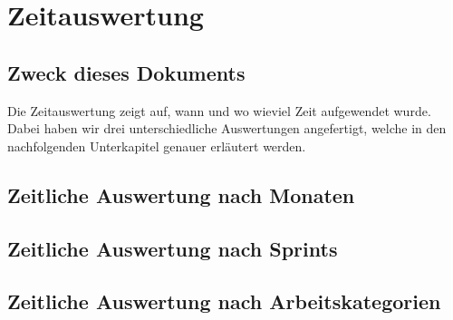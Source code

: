 \section{Zeitauswertung}

\subsection{Zweck dieses Dokuments}
Die Zeitauswertung zeigt auf, wann und wo wieviel Zeit aufgewendet wurde. Dabei haben wir drei unterschiedliche Auswertungen angefertigt, welche in den nachfolgenden Unterkapitel genauer erläutert werden.

\subsection{Zeitliche Auswertung nach Monaten}

\subsection{Zeitliche Auswertung nach Sprints}
\subsection{Zeitliche Auswertung nach Arbeitskategorien}